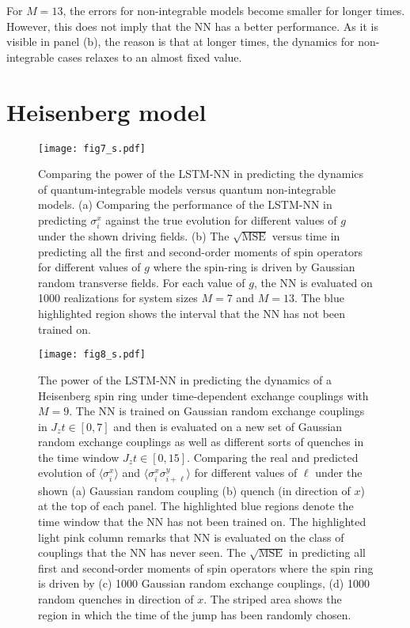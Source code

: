 \documentclass[a4paper,aps,amsmath,amssymb,twocolumn,longbibliography,,accepted=2022-05-17]{quantumarticle}
\begin{document}
For $M=13$, the errors for non-integrable models become smaller for longer times. However, this does not imply that the NN has  a  better performance. As it is visible in panel (b), the reason is that at longer times, the dynamics for non-integrable cases relaxes to an almost fixed value.


\section{Heisenberg model}

\begin{figure}[t]
	\centering
	\texttt{[image: fig7\_s.pdf]}
	\caption{
		Comparing the power of the LSTM-NN in predicting the dynamics of quantum-integrable models versus quantum non-integrable models.
		(a) Comparing the performance of the LSTM-NN in predicting $\sigma_{i}^{x}$ against the true evolution for different values of $g$ under the shown driving fields.
		(b) The $\sqrt{\textrm{MSE}}$ versus time in predicting all the first and second-order moments of spin operators for different values of $g$ where the spin-ring is driven by  Gaussian random transverse fields. For each value of $g$, the NN is evaluated on 1000 realizations for system sizes $M=7$ and $M=13$. The blue highlighted region shows the interval that the NN has not been trained on.
	}
	\label{figS7}
\end{figure}

\begin{figure}[ht]
	\centering
	\texttt{[image: fig8\_s.pdf]}
	\caption{
		The power of the LSTM-NN in predicting the dynamics of a Heisenberg spin ring under time-dependent exchange couplings with $M=9$. The NN is trained on  Gaussian random exchange couplings in $J_z t \in[0,7]$ and then is evaluated on a new set of  Gaussian random exchange couplings as well as different sorts of quenches in the time window $J_z t \in[0,15]$. Comparing the real and predicted evolution of $\langle \sigma^x_i \rangle$ and $\langle \sigma^{x}_{i}\sigma^{y}_{i+\ell}\rangle$ for different values of $\ell$ under the shown (a)  Gaussian random coupling (b) quench (in direction of $x$) at the top of each panel. The highlighted blue regions denote the time window that the NN has not been trained on. The highlighted light pink column remarks that NN is evaluated on the class of couplings that the NN has never seen. The $\sqrt{\textrm{MSE}}$ in predicting all first and second-order moments of spin operators where the spin ring is driven by (c) 1000  Gaussian random exchange couplings, (d) 1000 random quenches in direction of $x$. The striped area shows the region in which the time of the jump has been randomly chosen.
	}
	\label{figS8}
\end{figure}
\end{document}
